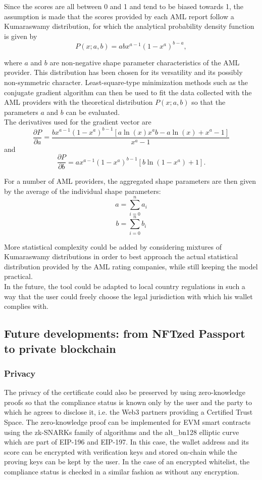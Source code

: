 ﻿\documentclass[a4paper]{article}
\begin{document}
Since the scores are all between 0 and 1 and tend to be biased towards 1, the assumption is made that the scores provided by each AML report follow a Kumaraswamy distribution, for which the analytical probability density function is given by
$$P(x; a,b)=abx^{a-1}\left(1-x^a\right)^{b-a},$$  

\noindent where $a$ and $b$ are non-negative shape parameter characteristics of the AML provider. This distribution has been chosen for its versatility and its possibly non-symmetric character.
Least-square-type minimization methods such as the conjugate gradient algorithm can then be used to fit the data collected with the AML providers with the theoretical distribution $P(x; a,b)$ so that the parameters $a$ and $b$ can be evaluated. \\

The derivatives used for the gradient vector are
$$\frac{\partial P}{\partial a}=\frac{bx^{a-1}\left(1-x^a\right)^{b-1}\left[a\ln(x)x^ab
-a\ln(x)+x^a-1\right]}{x^a-1}$$
and 
$$\frac{\partial P}{\partial b}=ax^{a-1}\left(1-x^a\right)^{b-1}\left[b\ln(1-x^a)+1\right].$$

For a number of AML providers, the aggregated shape parameters are then given by the average of the individual shape parameters:
$$a=\sum_{i=0}^na_i$$
$$b=\sum_{i=0}^nb_i$$  

More statistical complexity could be added by considering mixtures of Kumaraswamy distributions in order to best approach the actual statistical distribution provided by the AML rating companies, while still keeping the model practical. \\

In the future, the tool could be adapted to local country regulations in such a way that the user could freely choose the legal jurisdiction with which his wallet complies with.

\subsection{Future developments: from NFTzed Passport to private blockchain}
\subsubsection{Privacy}
The privacy of the certificate could also be preserved by using zero-knowledge proofs so that the compliance status is known only by the user and the party to which he agrees to disclose it, i.e. the Web3 partners providing a Certified Trust Space.  The zero-knowledge proof can be implemented for EVM smart contracts using the zk-SNARKs family of algorithms and the alt\_bn128 elliptic curve which are part of EIP-196 and EIP-197. In this case, the wallet address and its score can be encrypted with verification keys and stored on-chain while the proving keys can be kept by the user. In the case of an encrypted whitelist, the compliance status is checked in a similar fashion as without any encryption. \\
\end{document}
